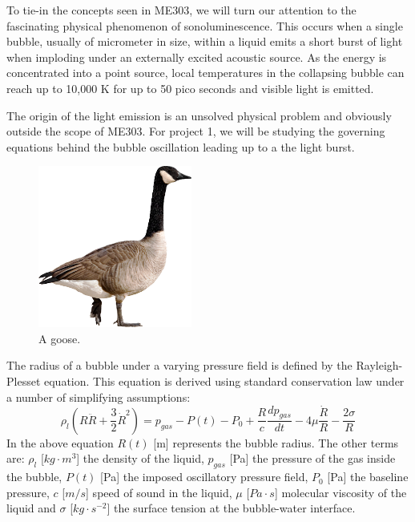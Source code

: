 \documentclass[12pt]{article}
\begin{document}
\\ \\ \\ \\ \\
To tie-in the concepts seen in ME303, we will turn our attention to the fascinating physical phenomenon of sonoluminescence. This occurs when a single bubble, usually of micrometer in size, within a liquid emits a short burst of light when imploding under an externally excited acoustic source. As the energy is concentrated into a point source, local temperatures in the collapsing bubble can reach up to 10,000 K for up to 50 pico seconds and visible light is emitted.

The origin of the light emission is an unsolved physical problem and obviously outside the scope of ME303. For project 1, we will be studying the governing equations behind the bubble oscillation leading up to a the light burst.
\begin{figure}[h!]
\centering
\includegraphics[width=0.45\textwidth]{figures/goose.png} 
\caption{A goose.}
\label{goose}
\end{figure}


The radius of a bubble under a varying pressure field is defined by the Rayleigh-Plesset equation. This equation is derived using standard conservation law under a number of simplifying assumptions:
\begin{equation}
\rho_l \left(R\ddot{R} + \frac{3}{2}\dot{R}^2\right) = p_{gas} -P(t) -P_0 +\frac{R}{c}\frac{d p_{gas}}{dt} - 4\mu \frac{\dot{R}}{R}-\frac{2\sigma}{R}
\label{RP}
\end{equation}
In the above equation $R(t)$ [m] represents the bubble radius. The other terms are: $\rho_l$ [$kg\cdot m^3$]  the density of the liquid, $p_{gas}$ [Pa] the pressure of the gas inside the bubble, $P(t)$ [Pa] the imposed oscillatory pressure field, $P_0$ [Pa] the baseline pressure, $c$ [$m/s$] speed of sound in the liquid, $\mu$ [$Pa\cdot s$] molecular viscosity of the liquid and $\sigma$ [$kg\cdot s^{-2}$] the surface tension at the bubble-water interface.
\end{document}
